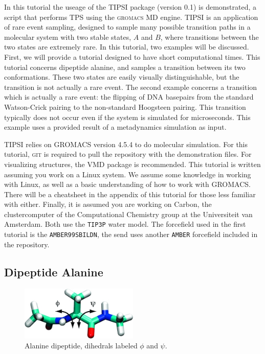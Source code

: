\documentclass[]{article}
\begin{document}
In this tutorial the useage of the \textsc{TIPSI} package (version 0.1) is demonstrated, a script that performs TPS using the \textsc{gromacs} MD engine. \textsc{TIPSI} is an application of rare event sampling, designed to sample many possible transition paths in a molecular system with two stable states, $A$ and $B$, where transitions between the two states are extremely rare. In this tutorial, two examples will be discussed. First, we will provide a tutorial designed to have short computational times. This tutorial concerns dipeptide alanine, and samples a transition between its two conformations. These two states are easily visually distinguishable, but the transition is not actually a rare event. The second example concerns a transition which is actually a rare event: the flipping of DNA basepairs from the standard Watson-Crick pairing to the non-standard Hoogsteen pairing. This transition typically does not occur even if the system is simulated for microseconds. This example uses a provided result of a metadynamics simulation as input. 

\textsc{TIPSI} relies on \textsc{GROMACS} version 4.5.4 to do molecular simulation. For this tutorial, \textsc{git} is required to pull the repository with the demonstration files. For visualizing structures, the VMD package is recommended. This tutorial is written assuming you work on a Linux system. We assume some knowledge in working with Linux, as well as a basic understanding of how to work with \textsc{GROMACS}. There will be a cheatsheet in the appendix of this tutorial for those less familiar with either. Finally, it is assumed you are working on Carbon, the clustercomputer of the Computational Chemistry group at the Universiteit van Amsterdam.
Both use the \texttt{TIP3P} water model. The forcefield used in the first tutorial is the \texttt{AMBER99SBILDN}, the send uses another \texttt{AMBER} forcefield included in the repository.

\subsection*{Dipeptide Alanine}

\begin{figure}[ht]
    \centering
    \includegraphics[width=0.5\textwidth]{images/alanine.png}
    \caption{Alanine dipeptide, dihedrals labeled $\phi$ and $\psi$.}
    \label{fig:alanine}
\end{figure}
\end{document}
